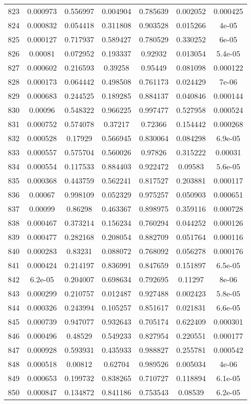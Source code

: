 \begin{table}
\begin{tabular}{c|c|c|c|c|c|c}
823 & 0.000973 & 0.556997 & 0.004904 & 0.785639 & 0.002052 & 0.000425\\
824 & 0.000832 & 0.054418 & 0.311808 & 0.903528 & 0.015266 & 4e-05\\
825 & 0.000127 & 0.717937 & 0.589427 & 0.780529 & 0.330252 & 6e-05\\
826 & 0.00081 & 0.072952 & 0.193337 & 0.92932 & 0.013054 & 5.4e-05\\
827 & 0.000602 & 0.216593 & 0.39258 & 0.95449 & 0.081098 & 0.000122\\
828 & 0.000173 & 0.064442 & 0.498508 & 0.761173 & 0.024429 & 7e-06\\
829 & 0.000683 & 0.244525 & 0.189285 & 0.884137 & 0.040846 & 0.000144\\
830 & 0.00096 & 0.548322 & 0.966225 & 0.997477 & 0.527958 & 0.000524\\
831 & 0.000752 & 0.574078 & 0.37217 & 0.72366 & 0.154442 & 0.000268\\
832 & 0.000528 & 0.17929 & 0.566945 & 0.830064 & 0.084298 & 6.9e-05\\
833 & 0.000557 & 0.575704 & 0.560026 & 0.97826 & 0.315222 & 0.00031\\
834 & 0.000554 & 0.117533 & 0.884403 & 0.922472 & 0.09583 & 5.6e-05\\
835 & 0.000368 & 0.443759 & 0.562241 & 0.817527 & 0.203881 & 0.000117\\
836 & 0.00067 & 0.998109 & 0.052329 & 0.975257 & 0.050903 & 0.000651\\
837 & 0.00099 & 0.86298 & 0.463367 & 0.898975 & 0.359116 & 0.000728\\
838 & 0.000467 & 0.373214 & 0.156234 & 0.760294 & 0.044252 & 0.000126\\
839 & 0.000477 & 0.282168 & 0.208054 & 0.882709 & 0.051764 & 0.000116\\
840 & 0.000283 & 0.83231 & 0.088072 & 0.768092 & 0.056278 & 0.000176\\
841 & 0.000424 & 0.214197 & 0.836991 & 0.847659 & 0.151897 & 6.5e-05\\
842 & 6.2e-05 & 0.204007 & 0.698634 & 0.792695 & 0.11297 & 8e-06\\
843 & 0.000299 & 0.210757 & 0.012487 & 0.927488 & 0.002423 & 5.8e-05\\
844 & 0.000326 & 0.243994 & 0.105257 & 0.851617 & 0.021831 & 6.6e-05\\
845 & 0.000739 & 0.947077 & 0.932643 & 0.705174 & 0.622409 & 0.000301\\
846 & 0.000496 & 0.48529 & 0.549233 & 0.827954 & 0.220551 & 0.000177\\
847 & 0.000928 & 0.593931 & 0.435933 & 0.988827 & 0.255781 & 0.000542\\
848 & 0.000518 & 0.00812 & 0.62704 & 0.989526 & 0.005034 & 4e-06\\
849 & 0.000653 & 0.199732 & 0.838265 & 0.710727 & 0.118894 & 6.1e-05\\
850 & 0.000847 & 0.134872 & 0.841186 & 0.753543 & 0.08539 & 6.2e-05\\
\end{tabular}
\end{table}
